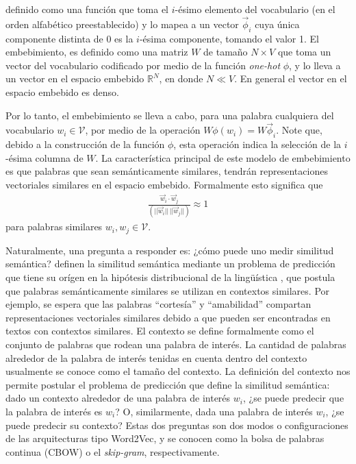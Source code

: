 \documentclass[
  spanish,
]{article}
\begin{document}
definido como una función que toma el \(i\)-ésimo elemento del
vocabulario (en el orden alfabético preestablecido) y lo mapea a un
vector \(\vec{\phi}_i\) cuya única componente distinta de 0 es la
\(i\)-ésima componente, tomando el valor 1. El embebimiento, es definido
como una matriz \(W\) de tamaño \(N\times V\) que toma un vector del
vocabulario codificado por medio de la función \emph{one-hot} \(\phi\),
y lo lleva a un vector en el espacio embebido \(\mathbb{R}^N\), en donde
\(N \ll V\). En general el vector en el espacio embebido es denso.

Por lo tanto, el embebimiento se lleva a cabo, para una palabra
cualquiera del vocabulario \(w_i\in\mathcal{V}\), por medio de la
operación \(W\phi(w_i) = W\vec{\phi}_i\). Note que, debido a la
construcción de la función \(\phi\), esta operación indica la selección
de la \(i\)-ésima columna de \(W\). La característica principal de este
modelo de embebimiento es que palabras que sean semánticamente
similares, tendrán representaciones vectoriales similares en el espacio
embebido. Formalmente esto significa que \begin{align}
\frac{\vec{w}_i\cdot \vec{w}_j}{(||\vec{w}_i|| \, ||\vec{w}_j||)} \approx 1
\end{align} para palabras similares \(w_i,w_j\in\mathcal{V}\).

Naturalmente, una pregunta a responder es: ¿cómo puede uno medir
similitud semántica? \citet{mikolov2013distributed} definen la similitud
semántica mediante un problema de predicción que tiene su orígen en la
hipótesis distribucional de la lingüística
\citep{harris1954distributional}, que postula que palabras
semánticamente similares se utilizan en contextos similares. Por
ejemplo, se espera que las palabras ``cortesía'' y ``amabilidad''
compartan representaciones vectoriales similares debido a que pueden ser
encontradas en textos con contextos similares. El contexto se define
formalmente como el conjunto de palabras que rodean una palabra de
interés. La cantidad de palabras alrededor de la palabra de interés
tenidas en cuenta dentro del contexto usualmente se conoce como el
tamaño del contexto. La definición del contexto nos permite postular el
problema de predicción que define la similitud semántica: dado un
contexto alrededor de una palabra de interés \(w_i\), ¿se puede predecir
que la palabra de interés es \(w_i\)? O, similarmente, dada una palabra
de interés \(w_i\), ¿se puede predecir su contexto? Estas dos preguntas
son dos modos o configuraciones de las arquitecturas tipo Word2Vec, y se
conocen como la bolsa de palabras continua (CBOW) o el \emph{skip-gram},
respectivamente.
\end{document}

